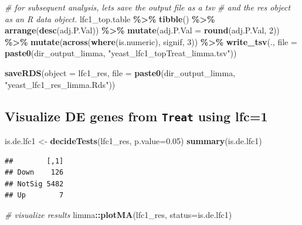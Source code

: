 \documentclass[
]{book}
\newenvironment{Shaded}{\begin{snugshade}}{\end{snugshade}}
\newcommand{\AttributeTok}[1]{\textcolor[rgb]{0.13,0.29,0.53}{#1}}
\newcommand{\CommentTok}[1]{\textcolor[rgb]{0.56,0.35,0.01}{\textit{#1}}}
\newcommand{\DecValTok}[1]{\textcolor[rgb]{0.00,0.00,0.81}{#1}}
\newcommand{\FloatTok}[1]{\textcolor[rgb]{0.00,0.00,0.81}{#1}}
\newcommand{\FunctionTok}[1]{\textcolor[rgb]{0.13,0.29,0.53}{\textbf{#1}}}
\newcommand{\NormalTok}[1]{#1}
\newcommand{\OtherTok}[1]{\textcolor[rgb]{0.56,0.35,0.01}{#1}}
\newcommand{\SpecialCharTok}[1]{\textcolor[rgb]{0.81,0.36,0.00}{\textbf{#1}}}
\newcommand{\StringTok}[1]{\textcolor[rgb]{0.31,0.60,0.02}{#1}}
\begin{document}
\begin{Shaded}
\begin{Highlighting}[]
\CommentTok{\# for subsequent analysis, let\textquotesingle{}s save the output file as a tsv}
\CommentTok{\# and the res object as an R data object.}
\NormalTok{lfc1\_top.table }\SpecialCharTok{\%\textgreater{}\%} \FunctionTok{tibble}\NormalTok{() }\SpecialCharTok{\%\textgreater{}\%}
  \FunctionTok{arrange}\NormalTok{(}\FunctionTok{desc}\NormalTok{(adj.P.Val)) }\SpecialCharTok{\%\textgreater{}\%}
  \FunctionTok{mutate}\NormalTok{(}\AttributeTok{adj.P.Val =} \FunctionTok{round}\NormalTok{(adj.P.Val, }\DecValTok{2}\NormalTok{)) }\SpecialCharTok{\%\textgreater{}\%}
  \FunctionTok{mutate}\NormalTok{(}\FunctionTok{across}\NormalTok{(}\FunctionTok{where}\NormalTok{(is.numeric), signif, }\DecValTok{3}\NormalTok{)) }\SpecialCharTok{\%\textgreater{}\%}
  \FunctionTok{write\_tsv}\NormalTok{(., }\AttributeTok{file =} \FunctionTok{paste0}\NormalTok{(dir\_output\_limma, }\StringTok{"yeast\_lfc1\_topTreat\_limma.tsv"}\NormalTok{))}

\FunctionTok{saveRDS}\NormalTok{(}\AttributeTok{object =}\NormalTok{ lfc1\_res, }\AttributeTok{file =} \FunctionTok{paste0}\NormalTok{(dir\_output\_limma, }\StringTok{"yeast\_lfc1\_res\_limma.Rds"}\NormalTok{))}
\end{Highlighting}
\end{Shaded}

\hypertarget{visualize-de-genes-from-treat-using-lfc1}{%
\subsection{\texorpdfstring{Visualize DE genes from \texttt{Treat} using lfc=1}{Visualize DE genes from Treat using lfc=1}}\label{visualize-de-genes-from-treat-using-lfc1}}

\begin{Shaded}
\begin{Highlighting}[]
\NormalTok{is.de.lfc1 }\OtherTok{\textless{}{-}} \FunctionTok{decideTests}\NormalTok{(lfc1\_res, }\AttributeTok{p.value=}\FloatTok{0.05}\NormalTok{)}
\FunctionTok{summary}\NormalTok{(is.de.lfc1)}
\end{Highlighting}
\end{Shaded}

\begin{verbatim}
##        [,1]
## Down    126
## NotSig 5482
## Up        7
\end{verbatim}

\begin{Shaded}
\begin{Highlighting}[]
\CommentTok{\# visualize results}
\NormalTok{limma}\SpecialCharTok{::}\FunctionTok{plotMA}\NormalTok{(lfc1\_res, }\AttributeTok{status=}\NormalTok{is.de.lfc1)}
\end{Highlighting}
\end{Shaded}
\end{document}
